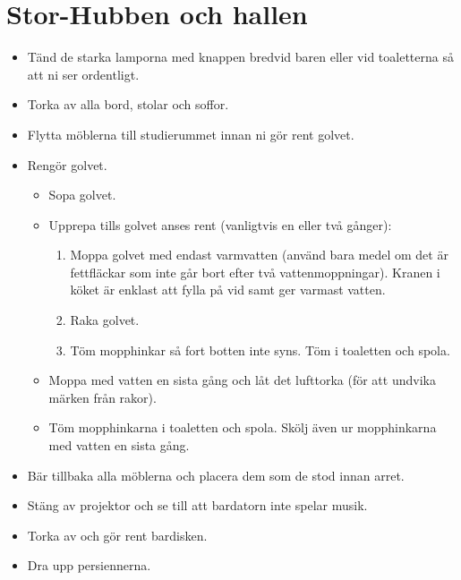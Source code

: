 \section{Stor-Hubben och hallen}
\begin{itemize}
    \item Tänd de starka lamporna med knappen bredvid baren eller vid toaletterna så att ni ser ordentligt.
    \item Torka av alla bord, stolar och soffor.
    \item Flytta möblerna till studierummet innan ni gör rent golvet.
    \item Rengör golvet.
    \begin{itemize}
        \item Sopa golvet.
        \item Upprepa tills golvet anses rent (vanligtvis en eller två gånger):
        \begin{enumerate}
            \item Moppa golvet med endast varmvatten (använd bara medel om det är fettfläckar som inte går bort efter två vattenmoppningar). Kranen i köket är enklast att fylla på vid samt ger varmast vatten.
            \item Raka golvet.
            \item Töm mopphinkar så fort botten inte syns. Töm i toaletten och spola.
        \end{enumerate}
        \item Moppa med vatten en sista gång och låt det lufttorka (för att undvika märken från rakor).
        \item Töm mopphinkarna i toaletten och spola. Skölj även ur mopphinkarna med vatten en sista gång.
    \end{itemize}
    \item Bär tillbaka alla möblerna och placera dem som de stod innan arret.
    \item Stäng av projektor och se till att bardatorn inte spelar musik.
    \item Torka av och gör rent bardisken.
    \item Dra upp persiennerna.
\end{itemize}

